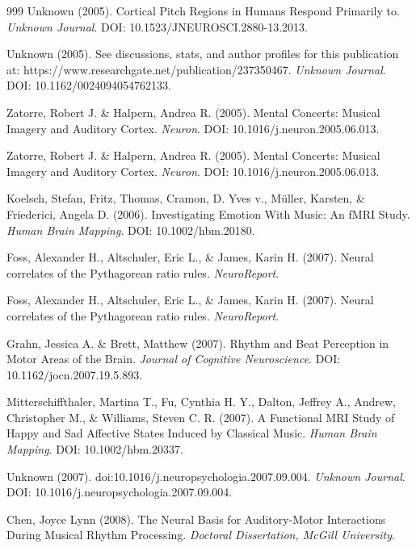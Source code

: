 \documentclass[9pt,onecolumn]{article}
\begin{document}
\begin{thebibliography}{999}
Unknown (2005). Cortical Pitch Regions in Humans Respond Primarily to. \textit{Unknown Journal}. DOI: 10.1523/JNEUROSCI.2880-13.2013.

Unknown (2005). See discussions, stats, and author profiles for this publication at: https://www.researchgate.net/publication/237350467. \textit{Unknown Journal}. DOI: 10.1162/0024094054762133.

Zatorre, Robert J. \& Halpern, Andrea R. (2005). Mental Concerts: Musical Imagery and Auditory Cortex. \textit{Neuron}. DOI: 10.1016/j.neuron.2005.06.013.

Zatorre, Robert J. \& Halpern, Andrea R. (2005). Mental Concerts: Musical Imagery and Auditory Cortex. \textit{Neuron}. DOI: 10.1016/j.neuron.2005.06.013.

Koelsch, Stefan, Fritz, Thomas, Cramon, D. Yves v., Müller, Karsten, \& Friederici, Angela D. (2006). Investigating Emotion With Music: An fMRI Study. \textit{Human Brain Mapping}. DOI: 10.1002/hbm.20180.

Foss, Alexander H., Altschuler, Eric L., \& James, Karin H. (2007). Neural correlates of the Pythagorean ratio rules. \textit{NeuroReport}.

Foss, Alexander H., Altschuler, Eric L., \& James, Karin H. (2007). Neural correlates of the Pythagorean ratio rules. \textit{NeuroReport}.

Grahn, Jessica A. \& Brett, Matthew (2007). Rhythm and Beat Perception in Motor Areas of the Brain. \textit{Journal of Cognitive Neuroscience}. DOI: 10.1162/jocn.2007.19.5.893.

Mitterschiffthaler, Martina T., Fu, Cynthia H. Y., Dalton, Jeffrey A., Andrew, Christopher M., \& Williams, Steven C. R. (2007). A Functional MRI Study of Happy and Sad Affective States Induced by Classical Music. \textit{Human Brain Mapping}. DOI: 10.1002/hbm.20337.

Unknown (2007). doi:10.1016/j.neuropsychologia.2007.09.004. \textit{Unknown Journal}. DOI: 10.1016/j.neuropsychologia.2007.09.004.

Chen, Joyce Lynn (2008). The Neural Basis for Auditory-Motor Interactions During Musical Rhythm Processing. \textit{Doctoral Dissertation, McGill University}.


\end{thebibliography}
\end{document}
